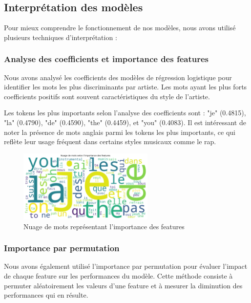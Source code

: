 \documentclass[a4paper,11pt]{article}
\begin{document}
\subsection{Interprétation des modèles}
\label{subsec:interpretation}

Pour mieux comprendre le fonctionnement de nos modèles, nous avons utilisé plusieurs techniques d'interprétation :

\subsubsection{Analyse des coefficients et importance des features}
Nous avons analysé les coefficients des modèles de régression logistique pour identifier les mots les plus discriminants par artiste. Les mots ayant les plus forts coefficients positifs sont souvent caractéristiques du style de l'artiste.

Les tokens les plus importants selon l'analyse des coefficients sont : "je" (0.4815), "la" (0.4790), "de" (0.4590), "the" (0.4459), et "you" (0.4083). Il est intéressant de noter la présence de mots anglais parmi les tokens les plus importants, ce qui reflète leur usage fréquent dans certains styles musicaux comme le rap.

\begin{figure}[ht]
    \centering
    \includegraphics[width=0.6\textwidth]{results_rapport/feature_importance_wordcloud.png}
    \caption{Nuage de mots représentant l'importance des features}
    \label{fig:feature-importance}
\end{figure}

\subsubsection{Importance par permutation}
Nous avons également utilisé l'importance par permutation pour évaluer l'impact de chaque feature sur les performances du modèle. Cette méthode consiste à permuter aléatoirement les valeurs d'une feature et à mesurer la diminution des performances qui en résulte.
\end{document}
